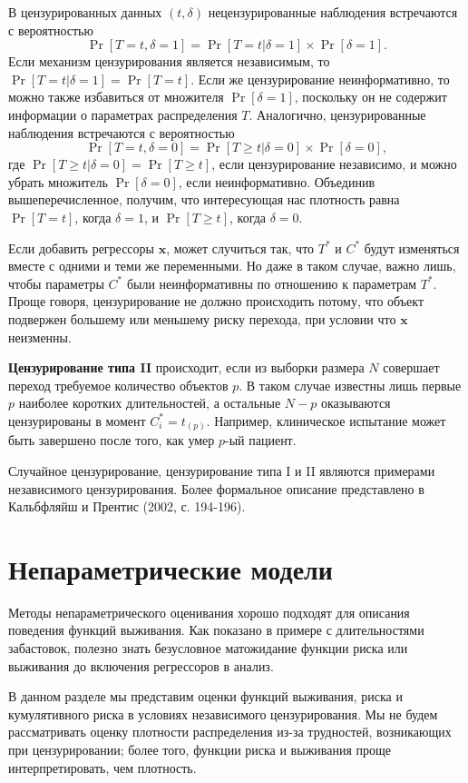 В цензурированных данных $(t,\delta)$ нецензурированные наблюдения встречаются с вероятностью
    $$\Pr{[T=t,\delta=1]}=\Pr{[T=t|\delta=1]}\times\Pr{[\delta=1]}.$$
Если механизм цензурирования является независимым, то $\Pr{[T=t|\delta=1]}=\Pr{[T=t]}$. Если же цензурирование неинформативно, то можно также избавиться от множителя $\Pr{[\delta=1]}$, поскольку он не содержит информации о параметрах распределения $T$. Аналогично, цензурированные наблюдения встречаются с вероятностью
    $$\Pr{[T=t,\delta=0]}=\Pr{[T\ge t|\delta=0]}\times\Pr{[\delta=0]},$$
где $\Pr{[T\ge t|\delta=0]}=\Pr{[T\ge t]}$, если цензурирование независимо, и можно убрать множитель $\Pr{[\delta=0]}$, если неинформативно. Объединив вышеперечисленное, получим, что интересующая нас плотность равна $\Pr{[T=t]}$, когда $\delta=1$, и $\Pr{[T\ge t]}$, когда $\delta=0$.

Если добавить регрессоры $\mathbf{x}$, может случиться так, что $T^*$ и $C^*$ будут изменяться вместе с одними и теми же переменными. Но даже в таком случае, важно лишь, чтобы параметры $C^*$ были неинформативны по отношению к параметрам $T^*$. Проще говоря, цензурирование не должно происходить потому, что объект подвержен большему или меньшему риску перехода, при условии что $\mathbf{x}$ неизменны.

\textbf{Цензурирование типа II} происходит, если из выборки размера $N$ совершает переход требуемое количество объектов $p$. В таком случае известны лишь первые $p$ наиболее коротких длительностей, а остальные $N-p$ оказываются цензурированы в момент $C^*_i=t_{(p)}$. Например, клиническое испытание может быть завершено после того, как умер $p$-ый пациент.

Случайное цензурирование, цензурирование типа I и II являются примерами независимого цензурирования. Более формальное описание представлено в Кальбфляйш и Прентис (2002, с. 194-196).


\section{Непараметрические модели}\label{sec:17.5}

\noindent
Методы непараметрического оценивания хорошо подходят для описания поведения функций выживания. Как показано в примере с длительностями забастовок, полезно знать безусловное матожидание функции риска или выживания до включения регрессоров в анализ.

В данном разделе мы представим оценки функций выживания, риска и кумулятивного риска в условиях независимого цензурирования. Мы не будем рассматривать оценку плотности распределения из-за трудностей, возникающих при цензурировании; более того, функции риска и выживания проще интерпретировать, чем плотность.

